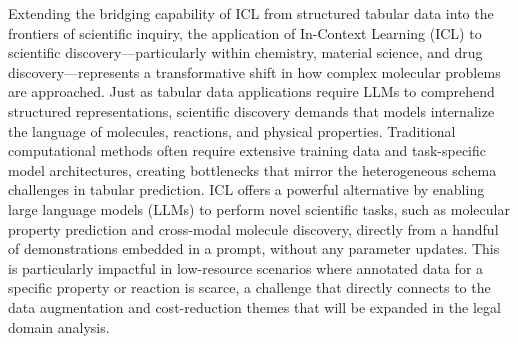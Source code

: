 \documentclass[11pt]{article}
\begin{document}
Extending the bridging capability of ICL from structured tabular data into the frontiers of scientific inquiry, the application of In-Context Learning (ICL) to scientific discovery---particularly within chemistry, material science, and drug discovery---represents a transformative shift in how complex molecular problems are approached. Just as tabular data applications require LLMs to comprehend structured representations, scientific discovery demands that models internalize the language of molecules, reactions, and physical properties. Traditional computational methods often require extensive training data and task-specific model architectures, creating bottlenecks that mirror the heterogeneous schema challenges in tabular prediction. ICL offers a powerful alternative by enabling large language models (LLMs) to perform novel scientific tasks, such as molecular property prediction and cross-modal molecule discovery, directly from a handful of demonstrations embedded in a prompt, without any parameter updates. This is particularly impactful in low-resource scenarios where annotated data for a specific property or reaction is scarce, a challenge that directly connects to the data augmentation and cost-reduction themes that will be expanded in the legal domain analysis.
\end{document}

